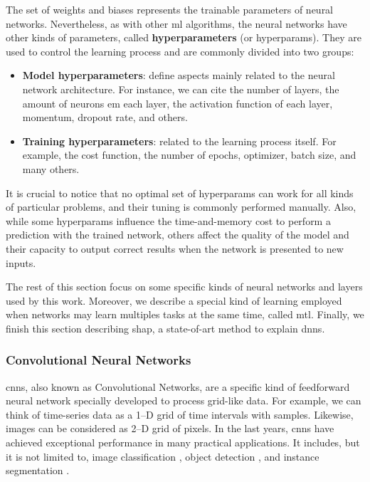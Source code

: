 The set of weights and biases represents the trainable parameters of neural networks. Nevertheless, as with other \acs{ml} algorithms, the neural networks have other kinds of parameters, called \textbf{hyperparameters} (or hyperparams). They are used to control the learning process and are commonly divided into two groups:

\begin{itemize}
\item \textbf{Model hyperparameters}: define aspects mainly related to the neural network architecture. For instance, we can cite the number of layers, the amount of neurons em each layer, the activation function of each layer, momentum, dropout rate, and others.

\item \textbf{Training hyperparameters}: related to the learning process itself. For example, the cost function, the number of epochs, optimizer, batch size, and many others.
\end{itemize}

It is crucial to notice that no optimal set of hyperparams can work for all kinds of particular problems, and their tuning is commonly performed manually. Also, while some hyperparams influence the time-and-memory cost to perform a prediction with the trained network, others affect the quality of the model and their capacity to output correct results when the network is presented to new inputs.

The rest of this section focus on some specific kinds of neural networks and layers used by this work. Moreover, we describe a special kind of learning employed when networks may learn multiples tasks at the same time, called \acl{mtl}. Finally, we finish this section describing \acs{shap}, a state-of-art method to explain \aclp{dnn}.

\subsubsection{Convolutional Neural Networks}

\acfp{cnn}, also known as Convolutional Networks, are a specific kind of feedforward neural network specially developed to process grid-like data. For example, we can think of time-series data as a 1--D grid of time intervals with samples. Likewise, images can be considered as 2--D grid of pixels. In the last years, \acsp{cnn} have achieved exceptional performance in many practical applications. It includes, but it is not limited to, image classification \citep{li2014medical, guo2017simple, paoletti2018new}, object detection \citep{cai2016unified, wu2017squeezedet}, and instance segmentation \citep{wang2020solov2, xu2020convolutional, zhang2020mask}.

